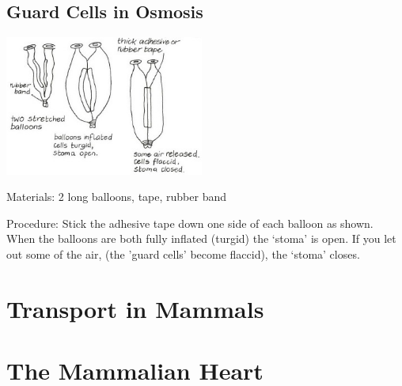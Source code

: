 \begin{multicols}{2}
\subsection{Guard Cells in Osmosis}

\begin{center}
\includegraphics[width=0.49\textwidth]{./img/vso/osmosis-guard-cells.jpg}
\end{center}

\begin{description*}
\item[Materials:]{2 long balloons, tape, rubber band}
\item[Procedure:]{Stick the adhesive tape down one
side of each balloon as shown.
When the balloons are both fully
inflated (turgid) the `stoma' is
open. If you let out some of the
air, (the 'guard cells' become
flaccid), the `stoma' closes.}
\end{description*}

\columnbreak


\section*{Transport in Mammals}  


\section*{The Mammalian Heart}  



\end{multicols}
